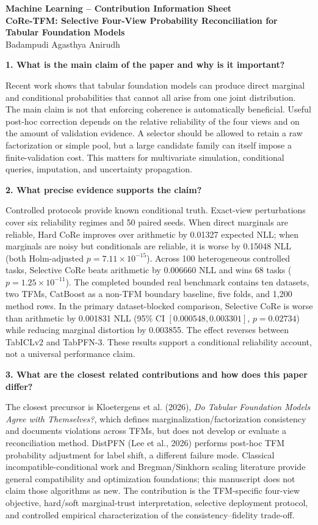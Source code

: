 \documentclass[11pt]{article}
\begin{document}
\begin{center}
{\Large\bfseries Machine Learning -- Contribution Information Sheet}\\[6pt]
{\bfseries CoRe-TFM: Selective Four-View Probability Reconciliation for Tabular Foundation Models}\\
Badampudi Agasthya Anirudh
\end{center}

\textbf{1. What is the main claim of the paper and why is it important?}

Recent work shows that tabular foundation models can produce direct marginal and conditional probabilities that cannot all arise from one joint distribution. The main claim is not that enforcing coherence is automatically beneficial. Useful post-hoc correction depends on the relative reliability of the four views and on the amount of validation evidence. A selector should be allowed to retain a raw factorization or simple pool, but a large candidate family can itself impose a finite-validation cost. This matters for multivariate simulation, conditional queries, imputation, and uncertainty propagation.

\textbf{2. What precise evidence supports the claim?}

Controlled protocols provide known conditional truth. Exact-view perturbations cover six reliability regimes and 50 paired seeds. When direct marginals are reliable, Hard CoRe improves over arithmetic by 0.01327 expected NLL; when marginals are noisy but conditionals are reliable, it is worse by 0.15048 NLL (both Holm-adjusted $p=7.11\times10^{-15}$). Across 100 heterogeneous controlled tasks, Selective CoRe beats arithmetic by 0.006660 NLL and wins 68 tasks ($p=1.25\times10^{-11}$). The completed bounded real benchmark contains ten datasets, two TFMs, CatBoost as a non-TFM boundary baseline, five folds, and 1,200 method rows. In the primary dataset-blocked comparison, Selective CoRe is worse than arithmetic by 0.001831 NLL (95\% CI $[0.000548,0.003301]$, $p=0.02734$) while reducing marginal distortion by 0.003855. The effect reverses between TabICLv2 and TabPFN-3. These results support a conditional reliability account, not a universal performance claim.

\textbf{3. What are the closest related contributions and how does this paper differ?}

The closest precursor is Kloetergens et al. (2026), \emph{Do Tabular Foundation Models Agree with Themselves?}, which defines marginalization/factorization consistency and documents violations across TFMs, but does not develop or evaluate a reconciliation method. DistPFN (Lee et al., 2026) performs post-hoc TFM probability adjustment for label shift, a different failure mode. Classical incompatible-conditional work and Bregman/Sinkhorn scaling literature provide general compatibility and optimization foundations; this manuscript does not claim those algorithms as new. The contribution is the TFM-specific four-view objective, hard/soft marginal-trust interpretation, selective deployment protocol, and controlled empirical characterization of the consistency--fidelity trade-off.
\end{document}
